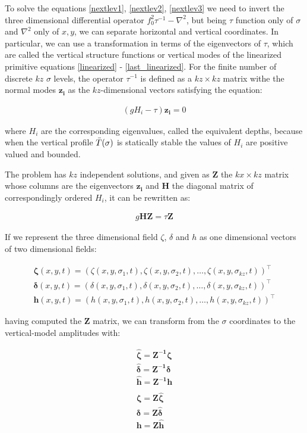 To solve the equations \ref{nextlev1}, \ref{nextlev2}, \ref{nextlev3} we need
to invert the three dimensional differential operator $f_0^2\tau^{-1}-\nabla^2$,
but being $\tau$ function only of $\sigma$ and $\nabla^2$ only of $x,y$, we can
separate horizontal and vertical coordinates.
In particular, we can use a transformation in terms of the eigenvectors of
$\tau$, which are called the vertical structure functions or vertical modes
of the linearized primitive equations \ref{linearized} - \ref{last_linearized}.
For the finite number of discrete $kz$ $\sigma$ levels, the operator $\tau^{-1}$
is defined as a $kz\times kz$ matrix withe the normal modes $\bm{z_i}$ as the
$kz$-dimensional vectors satisfying the equation:

\begin{gather}
  \left( g H_i - \tau \right) \bm{z_i} = 0
\end{gather}

where $H_i$ are the corresponding eigenvalues, called the equivalent depths,
because when the vertical profile $\bar{T}(\sigma)$ is statically stable the
values of $H_i$ are positive valued and bounded.

The problem has $kz$ independent solutions, and given as $\bm{Z}$ the
$kx\times kz$ matrix whose columns are the eigenvectors $\bm{z_i}$ and
$\bm{H}$ the diagonal matrix of correspondingly ordered $H_i$, it can
be rewritten as:

\begin{gather}
  g\bm{H}\bm{Z} = \tau \bm{Z}
\end{gather}

If we represent the three dimensional field $\zeta$, $\delta$ and $h$ as one
dimensional vectors of two dimensional fields:

\begin{gather}
  \bm{\zeta}(x,y,t) = (\zeta(x,y,\sigma_1,t),\zeta(x,y,\sigma_2,t),
         \dots,\zeta(x,y,\sigma_{kz},t))^\top \\
  \bm{\delta}(x,y,t) = (\delta(x,y,\sigma_1,t),\delta(x,y,\sigma_2,t),
         \dots,\delta(x,y,\sigma_{kz},t))^\top \\
  \bm{h}(x,y,t) = (h(x,y,\sigma_1,t),h(x,y,\sigma_2,t),
         \dots,h(x,y,\sigma_{kz},t))^\top
\end{gather}

having computed the $\bm{Z}$ matrix, we can transform from the $\sigma$
coordinates to the vertical-model amplitudes with:

\begin{gather}
  \label{hatz1}
  \hat{\bm{\zeta}} = \bm{Z^{-1}} \bm{\zeta} \\
  \label{hatz2}
  \hat{\bm{\delta}} = \bm{Z^{-1}} \bm{\delta} \\
  \label{hatz3}
  \hat{\bm{h}} = \bm{Z^{-1}} \bm{h} \\
  \nonumber \\
  \bm{\zeta} = \bm{Z} \hat{\bm{\zeta}} \\
  \bm{\delta} = \bm{Z} \hat{\bm{\delta}} \\
  \bm{h} = \bm{Z} \hat{\bm{h}}
\end{gather}

